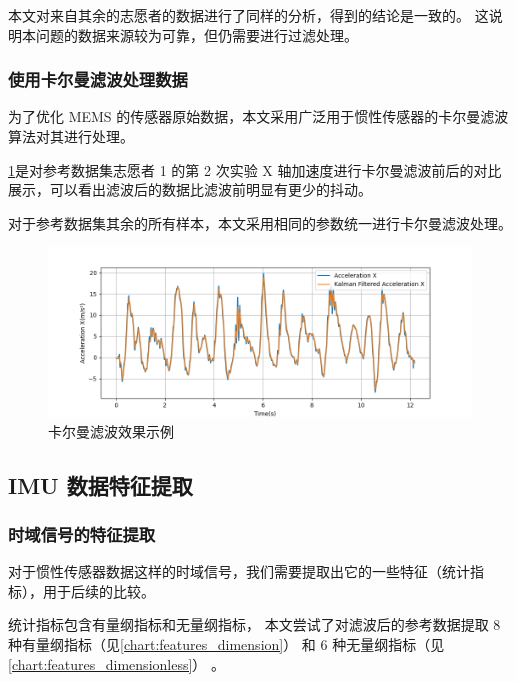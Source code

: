 \documentclass[withoutpreface]{cumcmthesis}
\begin{document}
本文对来自其余的志愿者的数据进行了同样的分析，得到的结论是一致的。
这说明本问题的数据来源较为可靠，但仍需要进行过滤处理。

\subsubsection{使用卡尔曼滤波处理数据}

为了优化 MEMS 的传感器原始数据，本文采用广泛用于惯性传感器的卡尔曼滤波算法对其进行处理。

\cref{fig:Kalman}是对参考数据集志愿者 1 的第 2 次实验 X 轴加速度进行卡尔曼滤波前后的对比展示，可以看出滤波后的数据比滤波前明显有更少的抖动。

对于参考数据集其余的所有样本，本文采用相同的参数统一进行卡尔曼滤波处理。

\begin{figure}[!htbp]
    \centering
    \includegraphics[width=\textwidth]{figures/kalman.png}
    \caption{卡尔曼滤波效果示例}
    \label{fig:Kalman}
\end{figure}

\subsection{IMU 数据特征提取}
\label{imu_features_extraction}

\subsubsection{时域信号的特征提取}
\label{features_extraction}

对于惯性传感器数据这样的时域信号，我们需要提取出它的一些特征（统计指标），用于后续的比较。

统计指标包含有量纲指标和无量纲指标，
本文尝试了对滤波后的参考数据提取 8 种有量纲指标（见\cref{chart:features_dimension}）
和 6 种无量纲指标（见\cref{chart:features_dimensionless}） \cite{1021136457.nh}。
\end{document}
